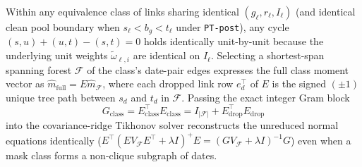 \documentclass[11pt]{article}
\theoremstyle{definition}
\theoremstyle{remark}
\begin{document}
Within any equivalence class of links sharing identical $(g_\ell, r_\ell, I_\ell)$ (and identical clean pool boundary when $s_\ell < b_g < t_\ell$ under \texttt{PT-post}), any cycle $(s, u) + (u, t) - (s, t) = 0$ holds identically unit-by-unit because the underlying unit weights $\tilde{\omega}_{\ell, i}$ are identical on $I_\ell$. Selecting a shortest-span spanning forest $\mathcal{F}$ of the class's date-pair edges expresses the full class moment vector as $\hat{m}_{\mathrm{full}} = E \hat{m}_{\mathcal{F}}$, where each dropped link row $e_d^\top$ of $E$ is the signed $(\pm 1)$ unique tree path between $s_d$ and $t_d$ in $\mathcal{F}$. Passing the exact integer Gram block
\[
G_{\mathrm{class}} = E_{\mathrm{class}}^\top E_{\mathrm{class}} = I_{|\mathcal{F}|} + E_{\mathrm{drop}}^\top E_{\mathrm{drop}}
\]
into the covariance-ridge Tikhonov solver reconstructs the unreduced normal equations identically ($E^\top (E V_{\mathcal{F}} E^\top + \lambda I)^+ E = (G V_{\mathcal{F}} + \lambda I)^{-1} G$) even when a mask class forms a non-clique subgraph of dates.
\end{document}
